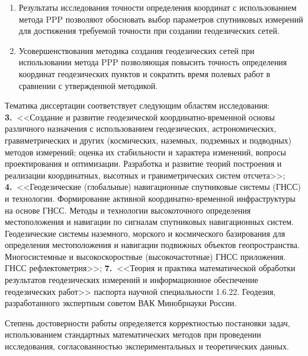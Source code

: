 {}
\begin{enumerate}[beginpenalty=10000] %
	\item Результаты исследования точности определения координат с использованием метода PPP позволяют обосновать выбор параметров спутниковых измерений для достижения требуемой точности при создании геодезических сетей.
	\item Усовершенствования методика создания геодезических сетей при использовании метода PPP позволяющая повысить точность определения координат геодезических пунктов и сократить время полевых работ в сравнении с утвержденной методикой.
\end{enumerate}

{\pasport}
Тематика диссертации соответствует следующим областям исследования: \textbf{3.~}<<Создание и развитие геодезической координатно-временной основы различного назначения с использованием геодезических, астрономических, гравиметрических и других (космических, наземных, подземных и подводных) методов измерений; оценка их стабильности и характера изменений, вопросы проектирования и оптимизации. Разработка и развитие теорий построения и реализации координатных, высотных и гравиметрических систем отсчета>>; \textbf{4.~}<<Геодезические (глобальные) навигационные спутниковые системы (ГНСС) и технологии. Формирование активной координатно-временной инфраструктуры на основе ГНСС. Методы и технологии высокоточного определения местоположения и навигации по сигналам спутниковых навигационных систем. Геодезические системы наземного, морского и космического базирования для определения местоположения и навигации подвижных объектов геопространства. Многосистемные и высокоскоростные (высокочастотные) ГНСС приложения. ГНСС рефлектометрия>>; \textbf{7.~}<<Теория и практика математической обработки  результатов геодезических измерений и информационное обеспечение геодезических работ>> паспорта научной специальности 1.6.22. Геодезия, разработанного экспертным советом ВАК Минобрнауки России.

{\reliability}
Степень достоверности работы определяется корректностью постановки задач, использованием стандартных математических методов при проведении исследования, согласованностью экспериментальных и теоретических данных.

